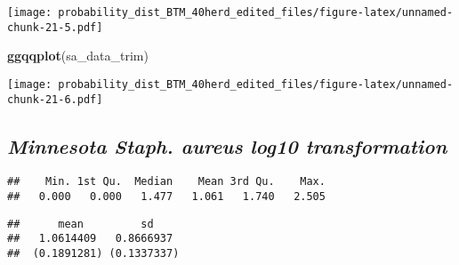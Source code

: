 \documentclass[]{article}
\newenvironment{Shaded}{\begin{snugshade}}{\end{snugshade}}
\newcommand{\KeywordTok}[1]{\textcolor[rgb]{0.13,0.29,0.53}{\textbf{#1}}}
\newcommand{\StringTok}[1]{\textcolor[rgb]{0.31,0.60,0.02}{#1}}
\newcommand{\CommentTok}[1]{\textcolor[rgb]{0.56,0.35,0.01}{\textit{#1}}}
\newcommand{\OperatorTok}[1]{\textcolor[rgb]{0.81,0.36,0.00}{\textbf{#1}}}
\newcommand{\NormalTok}[1]{#1}
\begin{document}
\texttt{[image: probability\_dist\_BTM\_40herd\_edited\_files/figure-latex/unnamed-chunk-21-5.pdf]}

\begin{Shaded}
\begin{Highlighting}[]
\KeywordTok{ggqqplot}\NormalTok{(sa_data_trim)}
\end{Highlighting}
\end{Shaded}

\texttt{[image: probability\_dist\_BTM\_40herd\_edited\_files/figure-latex/unnamed-chunk-21-6.pdf]}

\subsection{\texorpdfstring{\textbf{\emph{Minnesota Staph. aureus log10
transformation}}}{Minnesota Staph. aureus log10 transformation}}\label{minnesota-staph.-aureus-log10-transformation}

\begin{Shaded}
\end{Shaded}

\begin{verbatim}
##    Min. 1st Qu.  Median    Mean 3rd Qu.    Max. 
##   0.000   0.000   1.477   1.061   1.740   2.505
\end{verbatim}

\begin{Shaded}
\end{Shaded}

\begin{verbatim}
##      mean         sd    
##   1.0614409   0.8666937 
##  (0.1891281) (0.1337337)
\end{verbatim}
\end{document}
